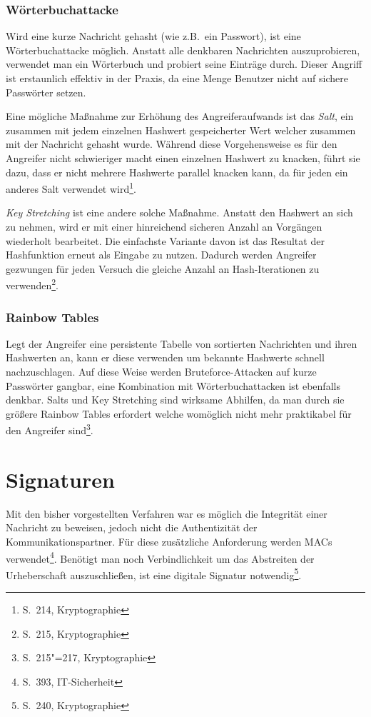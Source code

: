 \subsection{Wörterbuchattacke}

Wird eine kurze Nachricht gehasht (wie z.B.~ein Passwort), ist eine
Wörterbuchattacke möglich.  Anstatt alle denkbaren Nachrichten
auszuprobieren, verwendet man ein Wörterbuch und probiert seine
Einträge durch.  Dieser Angriff ist erstaunlich effektiv in der
Praxis, da eine Menge Benutzer nicht auf sichere Passwörter setzen.

Eine mögliche Maßnahme zur Erhöhung des Angreiferaufwands ist das
\emph{Salt}, ein zusammen mit jedem einzelnen Hashwert gespeicherter
Wert welcher zusammen mit der Nachricht gehasht wurde.  Während diese
Vorgehensweise es für den Angreifer nicht schwieriger macht einen
einzelnen Hashwert zu knacken, führt sie dazu, dass er nicht mehrere
Hashwerte parallel knacken kann, da für jeden ein anderes Salt
verwendet wird\footnote{S.~214, Kryptographie}.

\emph{Key Stretching} ist eine andere solche Maßnahme.  Anstatt den
Hashwert an sich zu nehmen, wird er mit einer hinreichend sicheren
Anzahl an Vorgängen wiederholt bearbeitet.  Die einfachste Variante
davon ist das Resultat der Hashfunktion erneut als Eingabe zu nutzen.
Dadurch werden Angreifer gezwungen für jeden Versuch die gleiche
Anzahl an Hash-Iterationen zu verwenden\footnote{S.~215,
  Kryptographie}.

\subsection{Rainbow Tables}

Legt der Angreifer eine persistente Tabelle von sortierten Nachrichten
und ihren Hashwerten an, kann er diese verwenden um bekannte Hashwerte
schnell nachzuschlagen.  Auf diese Weise werden Bruteforce-Attacken
auf kurze Passwörter gangbar, eine Kombination mit Wörterbuchattacken
ist ebenfalls denkbar.  Salts und Key Stretching sind wirksame
Abhilfen, da man durch sie größere Rainbow Tables erfordert welche
womöglich nicht mehr praktikabel für den Angreifer
sind\footnote{S.~215"=217, Kryptographie}.

\author{Autor: Vasilij Schneidermann}
\chapter{Signaturen}

Mit den bisher vorgestellten Verfahren war es möglich die Integrität
einer Nachricht zu beweisen, jedoch nicht die Authentizität der
Kommunikationspartner.  Für diese zusätzliche Anforderung werden
\ac{MAC}s verwendet\footnote{S.~393, IT-Sicherheit}.  Benötigt man
noch Verbindlichkeit um das Abstreiten der Urheberschaft
auszuschließen, ist eine digitale Signatur notwendig\footnote{S.~240,
  Kryptographie}.

